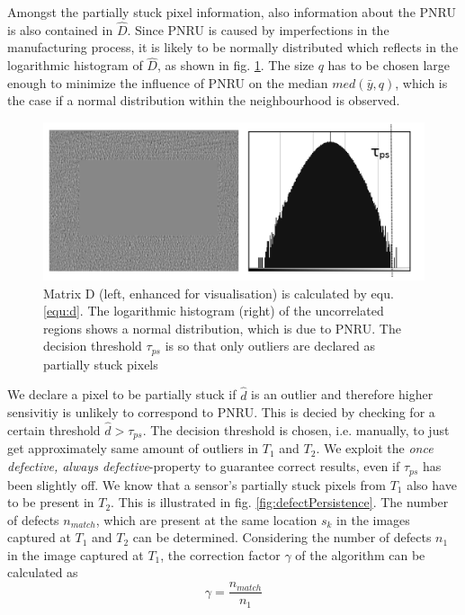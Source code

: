 \documentclass[10pt,twocolumn,letterpaper]{article}
\begin{document}
Amongst the partially stuck pixel information, also information about the PNRU is also contained in $\hat{D}$. Since PNRU is caused by imperfections in the manufacturing process, it is likely to be normally distributed which reflects in the logarithmic histogram of $\hat{D}$, as shown in fig. \ref{fig:defectMat}. The size $q$ has to be chosen large enough to minimize the influence of PNRU on the median $med(\bar{y},q)$, which is the case if a normal distribution within the neighbourhood is observed.

\begin{figure}[h]
  \centering
  \includegraphics[width=\linewidth]{img/defectMatWithTau.png}
  \caption{Matrix D (left, enhanced for visualisation) is calculated by equ. \ref{equ:d}. The logarithmic histogram (right) of the uncorrelated regions shows a normal distribution, which is due to PNRU. The decision threshold $\tau_{ps}$ is so that only outliers are declared as partially stuck pixels}
  \label{fig:defectMat}
\end{figure}


We declare a pixel to be partially stuck if $\hat{d}$ is an outlier and therefore higher sensivitiy is unlikely to correspond to PNRU. This is decied by checking for a certain threshold $\hat{d} > \tau_{ps}$. The decision threshold is chosen, i.e. manually, to just get approximately same amount of outliers in $T_1$ and $T_2$. We exploit the \emph{once defective, always defective}-property to guarantee correct results, even if $\tau_{ps}$ has been slightly off. We know that a sensor's partially stuck pixels from $T_1$ also have to be present in $T_2$. This is illustrated in fig. \ref{fig:defectPersistence}. The number of defects $n_{match}$, which are present at the same location $s_k$ in the images captured at $T_1$ and $T_2$ can be determined. Considering the number of defects $n_1$ in the image captured at $T_1$, the correction factor $\gamma$ of the algorithm can be calculated as
\begin{equation}
\gamma = \frac{n_{match}}{n_1}
\end{equation}
\end{document}
